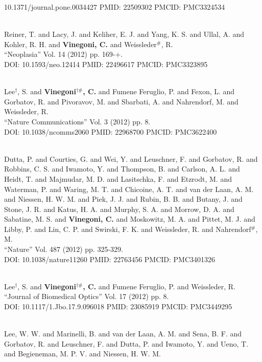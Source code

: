 10.1371/journal.pone.0034427 PMID: 22509302 PMCID: PMC3324534\item {} \\ Reiner, T. and Lacy, J. and Keliher, E. J. and Yang, K. S. and Ullal, A. and Kohler, R. H. and {\bf Vinegoni, C.} and Weissleder$^\#$, R. \\ ``Neoplasia'' Vol. 14 (2012) pp. 169-+. \\ DOI: 10.1593/neo.12414 PMID: 22496617 PMCID: PMC3323895\item {} \\ Lee$^\dag$, S. and {\bf Vinegoni$^{\dag \#}$, C.} and Fumene Feruglio, P. and Fexon, L. and Gorbatov, R. and Pivoravov, M. and Sbarbati, A. and Nahrendorf, M. and Weissleder, R. \\ ``Nature Communications'' Vol. 3 (2012) pp. 8. \\ DOI: 10.1038/ncomms2060 PMID: 22968700 PMCID: PMC3622400\item {} \\ Dutta, P. and Courties, G. and Wei, Y. and Leuschner, F. and Gorbatov, R. and Robbins, C. S. and Iwamoto, Y. and Thompson, B. and Carlson, A. L. and Heidt, T. and Majmudar, M. D. and Lasitschka, F. and Etzrodt, M. and Waterman, P. and Waring, M. T. and Chicoine, A. T. and van der Laan, A. M. and Niessen, H. W. M. and Piek, J. J. and Rubin, B. B. and Butany, J. and Stone, J. R. and Katus, H. A. and Murphy, S. A. and Morrow, D. A. and Sabatine, M. S. and {\bf Vinegoni, C.} and Moskowitz, M. A. and Pittet, M. J. and Libby, P. and Lin, C. P. and Swirski, F. K. and Weissleder, R. and Nahrendorf$^\#$, M. \\ ``Nature'' Vol. 487 (2012) pp. 325-329. \\ DOI: 10.1038/nature11260 PMID: 22763456 PMCID: PMC3401326\item {} \\ Lee$^\dag$, S. and {\bf Vinegoni$^{\dag \#}$, C.} and Fumene Feruglio, P. and Weissleder, R. \\ ``Journal of Biomedical Optics'' Vol. 17 (2012) pp. 8. \\ DOI: 10.1117/1.Jbo.17.9.096018 PMID: 23085919 PMCID: PMC3449295\item {} \\ Lee, W. W. and Marinelli, B. and van der Laan, A. M. and Sena, B. F. and Gorbatov, R. and Leuschner, F. and Dutta, P. and Iwamoto, Y. and Ueno, T. and Begieneman, M. P. V. and Niessen, H. W. M. 
